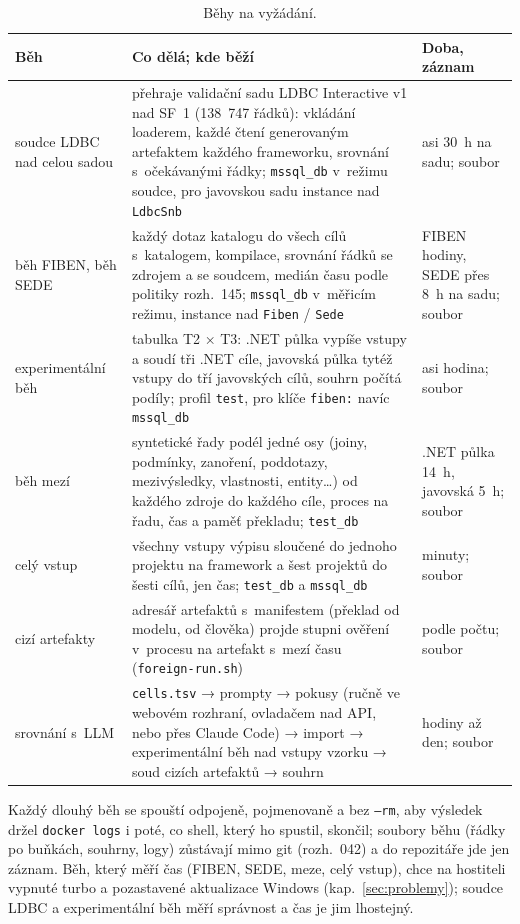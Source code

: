 \documentclass{article}
\begin{document}
\begin{table}[ht]
\centering\small
\begin{tabularx}{\textwidth}{L{2.9cm} Y L{3.3cm}}
\toprule
\textbf{Běh} & \textbf{Co dělá; kde běží} & \textbf{Doba, záznam} \\
\midrule
soudce LDBC nad celou sadou & přehraje validační sadu LDBC Interactive v1 nad SF~1 (138~747 řádků): vkládání loaderem, každé čtení generovaným artefaktem každého frameworku, srovnání s~očekávanými řádky; \texttt{mssql\_db} v~režimu soudce, pro javovskou sadu instance nad \texttt{LdbcSnb} & asi 30~h na sadu; soubor  \\
běh FIBEN, běh SEDE & každý dotaz katalogu do všech cílů s~katalogem, kompilace, srovnání řádků se zdrojem a se soudcem, medián času podle politiky rozh.~145; \texttt{mssql\_db} v~měřicím režimu, instance nad \texttt{Fiben} / \texttt{Sede} & FIBEN hodiny, SEDE přes 8~h na sadu; soubor \\
experimentální běh & tabulka T2 × T3: .NET půlka vypíše vstupy a soudí tři .NET cíle, javovská půlka tytéž vstupy do tří javovských cílů, souhrn počítá podíly; profil \texttt{test}, pro klíče \texttt{fiben:} navíc \texttt{mssql\_db} & asi hodina; soubor \\
běh mezí & syntetické řady podél jedné osy (joiny, podmínky, zanoření, poddotazy, mezivýsledky, vlastnosti, entity\ldots) od každého zdroje do každého cíle, proces na řadu, čas a paměť překladu; \texttt{test\_db} & .NET půlka 14~h, javovská 5~h; soubor \\
celý vstup & všechny vstupy výpisu sloučené do jednoho projektu na framework a šest projektů do šesti cílů, jen čas; \texttt{test\_db} a \texttt{mssql\_db} & minuty; soubor \\
cizí artefakty & adresář artefaktů s~manifestem (překlad od modelu, od člověka) projde stupni ověření v~procesu na artefakt s~mezí času (\texttt{foreign-run.sh}) & podle počtu; soubor \\
srovnání s~LLM & \texttt{cells.tsv} → prompty → pokusy (ručně ve webovém rozhraní, ovladačem nad API, nebo přes Claude Code) → import → experimentální běh nad vstupy vzorku → soud cizích artefaktů → souhrn & hodiny až den; soubor \\
\bottomrule
\end{tabularx}
\caption{Běhy na vyžádání.}
\label{tab:behy}
\end{table}

Každý dlouhý běh se spouští odpojeně, pojmenovaně a bez \texttt{--rm}, aby výsledek držel \texttt{docker logs} i poté, co shell, který ho spustil, skončil; soubory běhu (řádky po buňkách, souhrny, logy) zůstávají mimo git (rozh.~042) a do repozitáře jde jen záznam. Běh, který měří čas (FIBEN, SEDE, meze, celý vstup), chce na hostiteli vypnuté turbo a pozastavené aktualizace Windows (kap.~\ref{sec:problemy}); soudce LDBC a experimentální běh měří správnost a čas je jim lhostejný.
\end{document}
